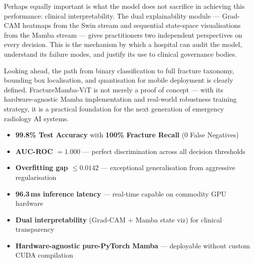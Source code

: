 \documentclass[12pt, a4paper]{article}
\begin{document}
Perhaps equally important is what the model does not sacrifice in achieving this performance:
clinical interpretability. The dual explainability module — Grad-CAM heatmaps from the Swin
stream and sequential state-space visualisations from the Mamba stream — gives practitioners two
independent perspectives on every decision. This is the mechanism by which a hospital can audit
the model, understand its failure modes, and justify its use to clinical governance bodies.

Looking ahead, the path from binary classification to full fracture taxonomy, bounding box
localisation, and quantisation for mobile deployment is clearly defined. FractureMamba-ViT is
not merely a proof of concept — with its hardware-agnostic Mamba implementation and real-world
robustness training strategy, it is a practical foundation for the next generation of emergency
radiology AI systems.

\vspace{0.8em}

\begin{tcolorbox}[keyresult, title={\bfseries\color{NavyBlue} Summary of Key Achievements}]
\begin{itemize}[itemsep=3pt]
  \item \textbf{99.8\% Test Accuracy} with \textbf{100\% Fracture Recall} (0 False Negatives)
  \item \textbf{AUC-ROC $= 1.000$} — perfect discrimination across all decision thresholds
  \item \textbf{Overfitting gap $\leq 0.0142$} — exceptional generalisation from aggressive
        regularisation
  \item \textbf{96.3\,ms inference latency} — real-time capable on commodity GPU hardware
  \item \textbf{Dual interpretability} (Grad-CAM + Mamba state viz) for clinical transparency
  \item \textbf{Hardware-agnostic pure-PyTorch Mamba} — deployable without custom CUDA
        compilation
\end{itemize}
\end{tcolorbox}
\end{document}
